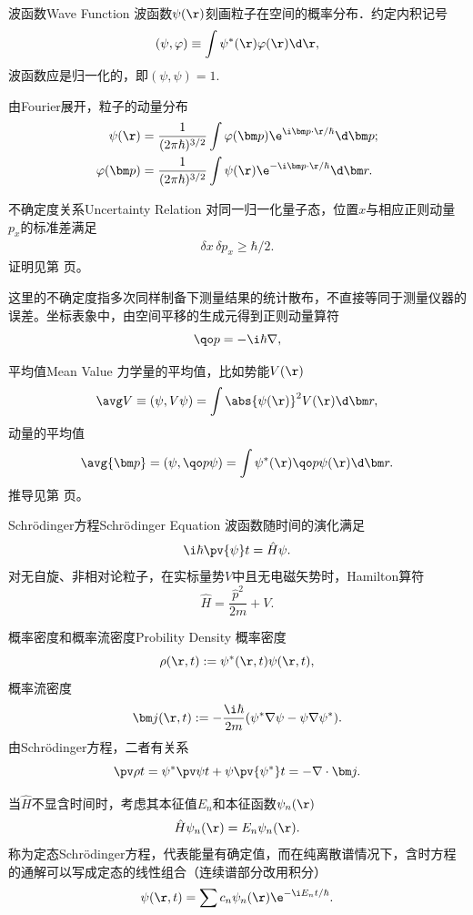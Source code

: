 \begin{definition}{波函数}{Wave Function}
	波函数$\psi(\r)$刻画粒子在空间的概率分布．约定内积记号
	\[
		(\psi,\varphi)\equiv\int\psi^*(\r)\varphi(\r)\d\r,
	\]	
	波函数应是归一化的，即$(\psi,\psi)=1.$
\end{definition}
由Fourier展开，粒子的动量分布
\begin{align}
	\psi(\r)       & =\frac1{(2\pi\hbar)^{3/2}}\int\varphi(\bm p)\e^{\i\bm p\cdot\r/\hbar}\d\bm p; \\
	\varphi(\bm p) & =\frac1{(2\pi\hbar)^{3/2}}\int\psi(\r)\e^{-\i\bm p\cdot\r/\hbar}\d\bm r.
\end{align}
\begin{theorem}{不确定度关系}{Uncertainty Relation}
	对同一归一化量子态，位置$x$与相应正则动量$p_x$的标准差满足
	\begin{align}
		\delta x\,\delta p_x\geqslant\hbar/2.
	\end{align}
	证明见第 \pageref{Proof of UR} 页。
\end{theorem}
这里的不确定度指多次同样制备下测量结果的统计散布，不直接等同于测量仪器的误差。坐标表象中，由空间平移的生成元得到正则动量算符
\[
	\qo p=-\i\hbar\nabla,
\]
\begin{definition}{平均值}{Mean Value}
	力学量的平均值，比如势能$V(\r)$
	\[
		\avg V\equiv(\psi,V\psi)=\int\abs{\psi(\r)}^2V(\r)\d\bm r,
	\]
	动量的平均值
	\[
		\avg{\bm p}=(\psi,\qo p\psi)=\int\psi^*(\r)\qo p\psi(\r)\d\bm r.
	\]
	推导见第 \pageref{Derivation of Mean Value} 页。
\end{definition}
\begin{theorem}{Schrödinger方程}{Schrödinger Equation}
	波函数随时间的演化满足
	\begin{align}
		\i\hbar\pv{\psi}t=\hat H\psi.
	\end{align}
	对无自旋、非相对论粒子，在实标量势$V$中且无电磁矢势时，Hamilton算符
	\[
		\hat H=\frac{\hat p^2}{2m}+V.
	\] %
\end{theorem}
\begin{definition}{概率密度和概率流密度}{Probility Density}
	概率密度
	\[
		\rho(\r,t):=\psi^*(\r,t)\psi(\r,t),
	\]
	概率流密度
	\[
		\bm j(\r,t):=-\frac{\i\hbar}{2m}(\psi^*\nabla\psi-\psi\nabla\psi^*).
	\]
	由Schrödinger方程，二者有关系
	\[
		\pv\rho{t}=\psi^*\pv\psi{t}+\psi\pv{\psi^*}t=-\nabla\cdot\bm j.
	\]
\end{definition}
当$\hat H$不显含时间时，考虑其本征值$E_n$和本征函数$\psi_n(\r)$
\begin{align}
	\hat H\psi_n(\r)=E_n\psi_n(\r).
\end{align}
称为定态Schrödinger方程，代表能量有确定值，而在纯离散谱情况下，含时方程的通解可以写成定态的线性组合（连续谱部分改用积分）
\[
	\psi(\r,t)=\sum c_n\psi_n(\r)\e^{-\i E_nt/\hbar}.
\]